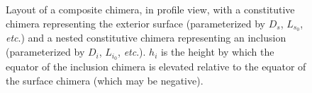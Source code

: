 \documentclass[10pt,a4paper]{article}
\def\etc{\emph{etc}.\xspace}
\begin{document}
\begin{figure}[t]
\begin{center}
{\begin{tikzpicture}
			\end{tikzpicture}
		}
	\end{center}
	\caption{Layout of a composite chimera, in profile view, with a constitutive chimera representing the exterior surface (parameterized by $D_s$, $L_{s_0}$, \etc) and a nested constitutive chimera representing an inclusion (parameterized by $D_i$, $L_{i_0}$, \etc). 
		$h_i$ is the height by which the equator of the inclusion chimera is elevated relative to the equator of the surface chimera (which may be negative). 
	} \label{fig:chimera2}
\end{figure}
	
	
	
\end{document}
